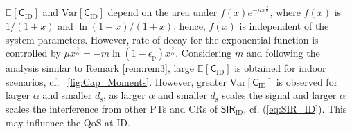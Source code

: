 \documentclass[conference, twocolumn]{IEEEtran}
\newcommand{\e}[2]{{\mathbb E}_{#1}\left[ #2 \right]}
\newcommand{\sub}[1]{_{\text{#1}}}
\begin{document}
$\e{}{\mathsf{C}_{\text{ID}}}$ and $\text{Var} [ \mathsf{C}_{\text{ID}} ]$ depend on the area under $f(x) e^{-\mu x^{\frac{2}{\alpha}}}$, where $f(x)$ is $1/(1 + x)$ and $\ln(1 + x )/(1 + x)$, hence, $f(x)$ is independent of the system parameters. However, rate of decay for the exponential function is controlled by $\mu x^{\frac{2}{\alpha}} = - m \ln({1 - \epsilon\sub{p}})x^{\frac{2}{\alpha}}$. Considering $m$ and following the analysis similar to Remark \ref{rem:rem3}, large $\e{}{\mathsf{C}_{\text{ID}}}$ is obtained for indoor scenarios, cf. \figurename~\ref{fig:Cap_Moments}. However, greater $\text{Var} [ \mathsf{C}_{\text{ID}} ]$ is observed for larger $\alpha$ and smaller $d\sub{s}$, as larger $\alpha$ and smaller $d\sub{s}$ scales the signal and larger $\alpha$ scales the interference from other PTs and CRs of $\mathsf{SIR}\sub{ID}$, cf. (\ref{eq:SIR_ID}). This may influence the QoS at ID. 
\end{document}
